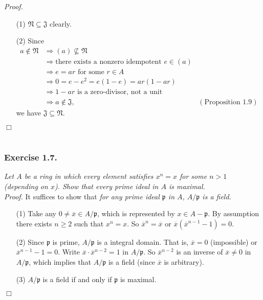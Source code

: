 \documentclass{article}
\begin{document}
\emph{Proof.}
\begin{enumerate}
\item[(1)]
  $\mathfrak{N} \subseteq \mathfrak{J}$ clearly.

\item[(2)]
  Since
  \begin{align*}
    a \not\in \mathfrak{N}
    &\Longrightarrow
    (a) \not\subseteq \mathfrak{N} \\
    &\Longrightarrow
    \text{there exists a nonzero idempotent $e \in (a)$} \\
    &\Longrightarrow
    \text{$e = ar$ for some $r \in A$} \\
    &\Longrightarrow
    0 = e - e^2 = e(1 - e) = ar(1 - ar) \\
    &\Longrightarrow
    \text{$1 - ar$ is a zero-divisor, not a unit} \\
    &\Longrightarrow
    a \not\in \mathfrak{J},
      &(\text{Proposition 1.9})
  \end{align*}
  we have $\mathfrak{J} \subseteq \mathfrak{N}$.
\end{enumerate}
$\Box$ \\\\






\subsubsection*{Exercise 1.7.}
\emph{Let $A$ be a ring in which every element satisfies
$x^n = x$ for some $n > 1$ (depending on $x$).
Show that every prime ideal in $A$ is maximal.} \\



\emph{Proof.}
It suffices to show that
\emph{for any prime ideal $\mathfrak{p}$ in $A$, $A/\mathfrak{p}$ is a field.}
\begin{enumerate}
\item[(1)]
  Take any $0 \neq \overline{x} \in A/\mathfrak{p}$,
  which is represented by $x \in A-\mathfrak{p}$.
  By assumption there exists $n \geq 2$ such that $x^n = x$.
  So $\overline{x}^n = \overline{x}$ or $\overline{x}(\overline{x}^{n-1} - 1) = 0$.

\item[(2)]
  Since $\mathfrak{p}$ is prime, $A/\mathfrak{p}$ is a integral domain.
  That is, $\overline{x} = 0$ (impossible) or $\overline{x}^{n-1} - 1 = 0$.
  Write $\overline{x} \cdot \overline{x}^{n-2} = 1$ in $A/\mathfrak{p}$.
  So $\overline{x}^{n-2}$ is an inverse of $\overline{x} \neq 0$ in $A/\mathfrak{p}$,
  which implies that $A/\mathfrak{p}$ is a field (since $\overline{x}$ is arbitrary).

\item[(3)]
  $A/\mathfrak{p}$ is a field if and only if $\mathfrak{p}$ is maximal.
\end{enumerate}
$\Box$ \\\\
\end{document}
